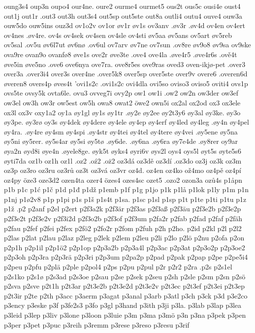 {{oung3s4
oup3n
oupo4
our4ne.
oure2
ourme4
ourmet5
ous2t
ous5c
ousi4e
oust4
out1j
out1r
.out3
out3h
out3s4
out5sp
out5ste
out8a
outli4
outu4
ouve4
ouw3a
ouw5do
ouw5ins
ouz3d
ov1o2v
ov1or
øv1r
øv1s
ov3anv
.øv3r
.øv4d
ov4en
ov4ert
ov4nes
.øv4re.
ov4s
ov4sek
ov4sen
ov4sle
ov4sti
øv5aa
øv5ans
ov5art
øv5reb
ov5sal
.ov5u
øv6l7ut
øv6nø
.ov6ul
ov7arv
øv7ne
ov7sun
.ov8re
øv9o8
øv9sa
ov9ske
ova9re
ovan9o
ovanfø8
øve1s
ove2r
øve3te
.ove4
ove4la
.øve4r5
.øve4r6s
.ově4t
øve5in
øve5no
.ove6
ove6nya
ove7ra.
ove8r5es
ove9ras
oved3
oven-ikjø-pet
.over3
over3a
.over3i4
over3s
over4ne
.over5k8
over5sp
over5ste
over9v
overe6
.overen6d
øveren8
overs4p
øves4t
'ovi1s2c
.ovi1s2c
ovi4dla
ovi5so
oviso3
oviso5
oviti4
ovs1p
ovs5te
ovsy5k
ovta6le.
ovu3
ovveg7i
ovy2p
ow1
ow1i
.ow2
ow2n
ow3der
ow3ef
ow3el
ow3h
ow3r
ow5est
ow5h
owa8
owat2
öwe2
own5i
ox2al
ox2od
ox3
ox3ele
ox3l
ox3v
oxy1a2
oy1a
øy1gl
øy1s
øy1tr
.øy2e
øy2ee
øy2t3y6
øy3al
øy3ke.
øy3o
øy3pe.
øy3rø
oy3s
øy4dek
øy4dere
øy4ele
øy4ep
øy4erf
øy4led
øy4leg
.øy4n
øy4pel
øy4ra.
.øy4re
øy4sm
øy4spi
.øy4str
øy4tei
øy4tel
øy4tere
øy4vei
.øy5ene
øy5na
øy5ni
øy5rer.
øy5s4ar
øy5si
øy5tø
.øy6de.
.øy6na
.øy6ra
øy7e4de
.øy8rer
oy9ar
øya2n
øyd8i
øye4n
.øyele8ge.
øyk5t
øyks4
øyri6v
øys2l
oys4
oys5l
øyt5s
øyte5s6
øyti7da
oz1b
oz1h
oz1l
.oz2
.oź2
.oż2
oz3dá
oz3dě
oz3dí
.oz3do
oz3j
oz3k
oz3m
oz3p
oz3ro
oz3ru
oz3rů
oz3t
oz3vá
oz3vr
oz4d.
oz4en
oz4ko
ož4mo
oz4pě
oz4pí
oz4py
öze3
oze3d2
ozen4ta
ozer4
özes4
ozes4sc
ozet5
.ozo2
ozon3a
ozů4s
p1åpn
p1b
p1c
p1ć
p1č
p1d
p1đ
p1dž
p1emb
p1f
p1g
p1jo
p1k
p1lå
p1lok
p1ly
p1m
p1n
p1nj
p1ø2v8
p1p
p1pi
p1s
p1š
p1s4t
p1sa.
p1sc
p1sl
p1sp
p1t
p1te
p1ti
p1tu
p1z
p1ž
.p2
p2anf
p2el
p2ert
p2f3a2k
p2f3är
p2f3as
p2f3aß
p2f3äu
p2f3e2b
p2f3e2p
p2f3e2t
p2f3e2v
p2f3i2d
p2f3o2b
p2f3of
p2f3um
p2fa2r
p2fab
p2fad
p2faf
p2fäh
p2fau
p2fef
p2fei
p2fex
p2fö2
p2fo2r
p2fom
p2fuh
p2h
p2ho.
p2id
p2kl
p2l
p2l2
p2las
p2lat
p2lau
p2laz
p2leg
p2lek
p2lem
p2leu
p2li
p2lo
p2lö
p2nu
p2ofa
p2on
p2p1h
p2p1il
p2p1ö2
p2p1op
p2p3a2b
p2p3a4l
p2p3ac
p2p3at
p2p3o2p
p2p3oe2
p2p3oh
p2p3ra
p2p3rä
p2p3ri
p2p3um
p2pa2p
p2pad
p2pak
p2pap
p2pe
p2pe5i4
p2peu
p2pfu
p2plä
p2ple
p2pol4
p2ps
p2pu
p2pul
p2r
p2r2
p2ra
.p2s
p2s1el
p2s1ko
p2s1ø
p2s3ad
p2s3oe
p2sau
p2se
p2sek
p2seu
p2sh
p2sle
p2sm
p2sn
p2sö
p2sva
p2sve
p2t1h
p2t3ar
p2t3e2b
p2t3e2d
p2t3e2v
p2t3ec
p2t3ef
p2t3ei
p2t3ep
p2t3ir
p2te
p2th
p3acc
p3aerm
p3agat
p3anal
p3arb
p3atl
p3ch
p3ck
p3d
p3e2co
p3ency
p3eske
p3f
p3fe2s3
p3fo
p3gl
p3hand
p3ith
p3ji
p3la.
p3lab
p3lap
p3lea
p3leid
p3lep
p3liv
p3lone
p3loon
p3luie
p3m
p3ma
p3mö
p3n
p3na
p3pek
p3pen
p3per
p3pet
p3puc
p3reih
p3remm
p3rese
p3reso
p3resu
p3rif
}}
